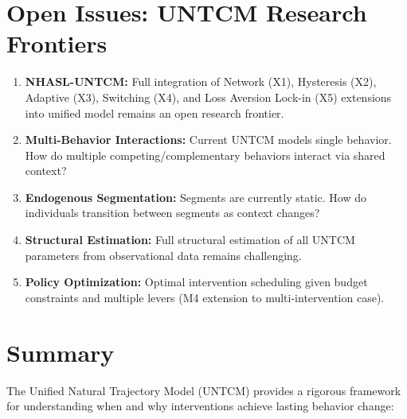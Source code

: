 \section{Open Issues: UNTCM Research Frontiers}
\label{sec:untcm-open}

\begin{enumerate}

\item \textbf{NHASL-UNTCM:} Full integration of Network (X1), Hysteresis (X2), Adaptive (X3), Switching (X4), and Loss Aversion Lock-in (X5) extensions into unified model remains an open research frontier.

\item \textbf{Multi-Behavior Interactions:} Current UNTCM models single behavior. How do multiple competing/complementary behaviors interact via shared context?

\item \textbf{Endogenous Segmentation:} Segments are currently static. How do individuals transition between segments as context changes?

\item \textbf{Structural Estimation:} Full structural estimation of all UNTCM parameters from observational data remains challenging.

\item \textbf{Policy Optimization:} Optimal intervention scheduling given budget constraints and multiple levers (M4 extension to multi-intervention case).

\end{enumerate}

\section{Summary}
\label{sec:untcm-summary}

The Unified Natural Trajectory Model (UNTCM) provides a rigorous framework for understanding when and why interventions achieve lasting behavior change:

